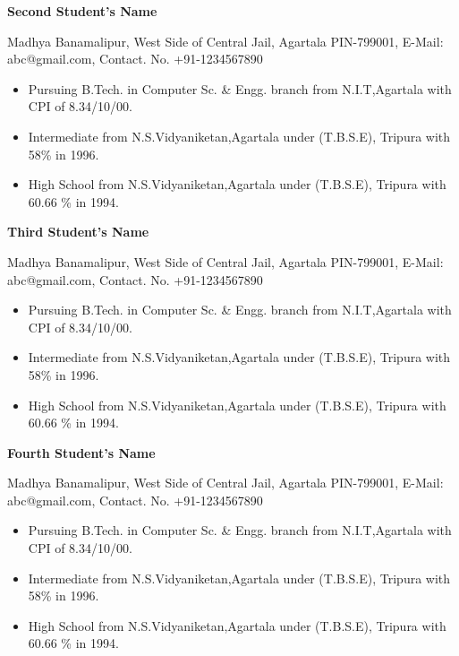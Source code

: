 \documentclass[english,a4paper,babel,12pt]{nitathesis}
\numberwithin{figure}{chapter}
\begin{document}
\begin{center}
{\textbf{\LARGE Second Student's Name}}\end{center} %
\begin{center}
Madhya Banamalipur, West Side of Central Jail, Agartala  PIN-799001,  E-Mail: abc@gmail.com,  Contact. No. +91-1234567890 \\
 \end{center}
 \begin{itemize}
\item Pursuing B.Tech. in Computer Sc. \& Engg. branch from N.I.T,Agartala with CPI of 8.34/10/00.
\item Intermediate from N.S.Vidyaniketan,Agartala under (T.B.S.E), Tripura with 58\% in 1996.
\item High School from N.S.Vidyaniketan,Agartala under (T.B.S.E), Tripura with 60.66 \% in 1994.
\end{itemize}

\begin{center}
{\textbf{\LARGE Third Student's Name}}\end{center} %
\begin{center}
Madhya Banamalipur, West Side of Central Jail, Agartala  PIN-799001,  E-Mail: abc@gmail.com,  Contact. No. +91-1234567890 \\
 \end{center}
 \begin{itemize}
\item Pursuing B.Tech. in Computer Sc. \& Engg. branch from N.I.T,Agartala with CPI of 8.34/10/00.
\item Intermediate from N.S.Vidyaniketan,Agartala under (T.B.S.E), Tripura with 58\% in 1996.
\item High School from N.S.Vidyaniketan,Agartala under (T.B.S.E), Tripura with 60.66 \% in 1994.
\end{itemize}

\begin{center}
{\textbf{\LARGE Fourth Student's Name}}\end{center} %
\begin{center}
Madhya Banamalipur, West Side of Central Jail, Agartala  PIN-799001,  E-Mail: abc@gmail.com,  Contact. No. +91-1234567890 \\
 \end{center}
 \begin{itemize}
\item Pursuing B.Tech. in Computer Sc. \& Engg. branch from N.I.T,Agartala with CPI of 8.34/10/00.
\item Intermediate from N.S.Vidyaniketan,Agartala under (T.B.S.E), Tripura with 58\% in 1996.
\item High School from N.S.Vidyaniketan,Agartala under (T.B.S.E), Tripura with 60.66 \% in 1994.
\end{itemize}
\end{document}
